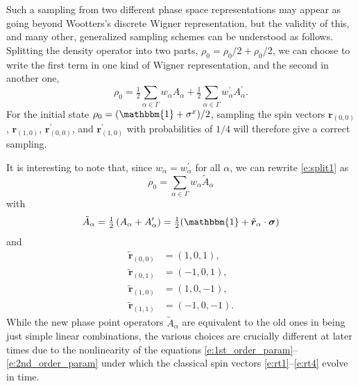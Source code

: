 \documentclass[aps,prl,showpacs,amsmath,amssymb,superscriptaddress,reprint,10pt]{revtex4-1}
\newcommand\id{{\mathbbm{1}}}
\newcommand{\mvec}[1]{\boldsymbol #1}
\begin{document}
Such a sampling from two different phase space representations may appear as going beyond Wootters's discrete Wigner representation, but the validity of this, and many other, generalized sampling schemes can be understood as follows. Splitting the density operator into two parts, $\rho_0=\rho_0/2+\rho_0/2$, we can choose to write the first term in one kind of Wigner representation, and the second in another one,
\begin{equation}\label{e:split1}
\rho_0=\tfrac{1}{2}\sum_{\alpha\in\Gamma}w_\alpha A_\alpha + \tfrac{1}{2}\sum_{\alpha\in\Gamma}w_\alpha^\prime A_\alpha^\prime.
\end{equation} 
For the initial state $\rho_0 = (\id+\sigma^x)/2$, sampling the spin vectors $\mvec{r}_{(0,0)}$, $\mvec{r}_{(1,0)}$, $\mvec{r}_{(0,0)}^\prime$, and $\mvec{r}_{(1,0)}^\prime$ with probabilities of $1/4$ will therefore give a correct sampling.

It is interesting to note that, since $w_\alpha=w_\alpha^\prime$ for all $\alpha$, we can rewrite \eqref{e:split1} as
\begin{equation}\label{e:split2}
\rho_0 = \sum_{\alpha\in\Gamma}w_\alpha \tilde{A}_\alpha
\end{equation}
with
\begin{equation}
\tilde{A}_\alpha = \tfrac{1}{2}\left(A_\alpha + A_\alpha^\prime\right) = \tfrac{1}{2}(\id+\tilde{\mvec{r}}_\alpha\cdot\mvec{\sigma})
\end{equation}
and
\begin{subequations}
\begin{align}
\tilde{\mvec{r}}_{(0,0)}&=(1,0,1),\label{e:rt1}\\
\tilde{\mvec{r}}_{(0,1)}&=(-1,0,1),\\
\tilde{\mvec{r}}_{(1,0)}&=(1,0,-1),\\
\tilde{\mvec{r}}_{(1,1)}&=(-1,0,-1).\label{e:rt4}
\end{align}
\end{subequations}
While the new phase point operators $\tilde{A}_\alpha$ are equivalent to the old ones in being just simple linear combinations, the various choices are crucially different at later times due to the nonlinearity of the equations \eqref{e:1st_order_param}--\eqref{e:2nd_order_param} under which the classical spin vectors \eqref{e:rt1}--\eqref{e:rt4} evolve in time.
\end{document}
